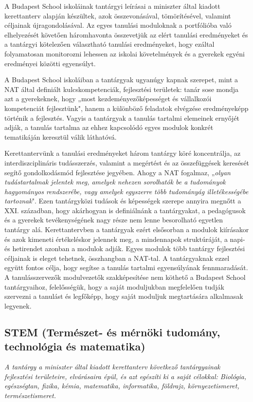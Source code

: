 A Budapest School iskoláinak tantárgyi leírásai a miniszter által kiadott
kerettanterv alapján készültek, azok összevonásával, tömörítésével, valamint
céljainak újragondolásával. Az egyes tanulási moduloknak a portfólióba való
elhelyezését követően háromhavonta összevetjük az elért tanulási eredményeket és 
a tantárgyi kötelezően választható tanulási eredményeket, hogy ezáltal folyamatosan monitorozni lehessen
az iskolai követelmények és a gyerekek egyéni eredményei közötti egyensúlyt.

A Budapest School iskoláiban a tantárgyak ugyanúgy kapnak szerepet, mint a NAT
által definiált kulcskompetenciák, fejlesztési területek: tanár sose mondja azt a gyerekeknek, hogy „most
kezdeményezőképességet és vállalkozói kompetenciát fejlesztünk", hanem a
különböző feladatok elvégzése eredményeképp történik a fejlesztés. Vagyis a
tantárgyak a tanulás tartalmi elemeinek ernyőjét adják, a tanulás tartalma az
ehhez kapcsolódó egyes modulok konkrét tematikáján keresztül válik láthatóvá.

Kerettantervünk a tanulási eredményeket három tantárgy köré koncentrálja, az interdiszciplináris
tudásszerzés, valamint a megértést és az összefüggések keresését segítő
gondolkodásmód fejlesztése jegyében. Ahogy a NAT fogalmaz, „\emph{olyan
tudástartalmak jelentek meg, amelyek nehezen sorolhatók be a tudományok
hagyományos rendszerébe, vagy amelyek egyszerre több tudományág illetékességébe
tartoznak}". Ezen tantárgyközi tudások és képességek szerepe annyira megnőtt a
XXI. században, hogy akárhogyan is definiálnánk a tantárgyakat, a pedagógusok
és a gyerekek tevékenységének nagy része nem lenne besorolható egyetlen tantárgy
alá. Kerettantervben a tantárgyak ezért elsősorban a modulok kiírásakor és azok
kimeneti értékeléskor jelennek meg, a mindennapok struktúráját, a napi- és
hetirendet azonban a modulok adják. Egyes modulok több tantárgy fejlesztési
céljainak is eleget tehetnek, összhangban a NAT-tal. A tantárgyaknak ezzel
együtt fontos célja, hogy segítse a tanulás tartalmi egyensúlyának
fennmaradását. A tanulásszervezők modulvezetők szakképesítése nem köthető a Budapest
School tantárgyaihoz, felelősségük, hogy a saját moduljukban megfelelően tudják
szervezni a tanulást és legfőképp, hogy saját moduljuk megtartására alkalmasak
legyenek.

\subsection[STEM]{STEM	(Természet- és mérnöki	tudomány, technológia és
  matematika)}
\emph{A tantárgy a miniszter által kiadott kerettanterv következő tantárgyainak
  fejlesztési területeire, elvárásaira épül, és azt egészíti ki a saját célokkal:
  Biológia, egészségtan, fizika, kémia, matematika, informatika, földrajz,
  környezetismeret, természetismeret.}

